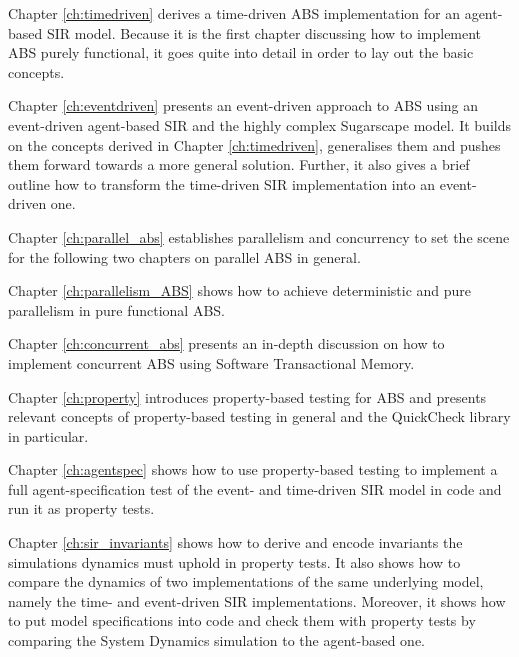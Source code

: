 \medskip

Chapter \ref{ch:timedriven} derives a time-driven ABS implementation for an agent-based SIR model. Because it is the first chapter discussing how to implement ABS purely functional, it goes quite into detail in order to lay out the basic concepts.

\medskip

Chapter \ref{ch:eventdriven} presents an event-driven approach to ABS using an event-driven agent-based SIR and the highly complex Sugarscape model. It builds on the concepts derived in Chapter \ref{ch:timedriven}, generalises them and pushes them forward towards a more general solution. Further, it also gives a brief outline how to transform the time-driven SIR implementation into an event-driven one.

\medskip

Chapter \ref{ch:parallel_abs} establishes parallelism and concurrency to set the scene for the following two chapters on parallel ABS in general.

\medskip

Chapter \ref{ch:parallelism_ABS} shows how to achieve deterministic and pure parallelism in pure functional ABS. 

\medskip

Chapter \ref{ch:concurrent_abs} presents an in-depth discussion on how to implement concurrent ABS using Software Transactional Memory.

\medskip

Chapter \ref{ch:property} introduces property-based testing for ABS and presents relevant concepts of property-based testing in general and the QuickCheck library in particular. 

\medskip

Chapter \ref{ch:agentspec} shows how to use property-based testing to implement a full agent-specification test of the event- and time-driven SIR model in code and run it as property tests.

\medskip

Chapter \ref{ch:sir_invariants} shows how to derive and encode invariants the simulations dynamics must uphold in property tests. It also shows how to compare the dynamics of two implementations of the same underlying model, namely the time- and event-driven SIR implementations. Moreover, it shows how to put model specifications into code and check them with property tests by comparing the System Dynamics simulation to the agent-based one.

\medskip

